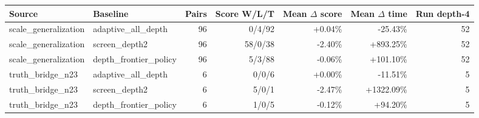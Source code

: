 \begin{tabular}{llrrrrr}
\toprule
Source & Baseline & Pairs & Score W/L/T & Mean $\Delta$ score & Mean $\Delta$ time & Run depth-4 \\
\midrule
scale\_generalization & adaptive\_all\_depth & 96 & 0/4/92 & +0.04\% & -25.43\% & 52 \\
scale\_generalization & screen\_depth2 & 96 & 58/0/38 & -2.40\% & +893.25\% & 52 \\
scale\_generalization & depth\_frontier\_policy & 96 & 5/3/88 & -0.06\% & +101.10\% & 52 \\
truth\_bridge\_n23 & adaptive\_all\_depth & 6 & 0/0/6 & +0.00\% & -11.51\% & 5 \\
truth\_bridge\_n23 & screen\_depth2 & 6 & 5/0/1 & -2.47\% & +1322.09\% & 5 \\
truth\_bridge\_n23 & depth\_frontier\_policy & 6 & 1/0/5 & -0.12\% & +94.20\% & 5 \\
\bottomrule
\end{tabular}
